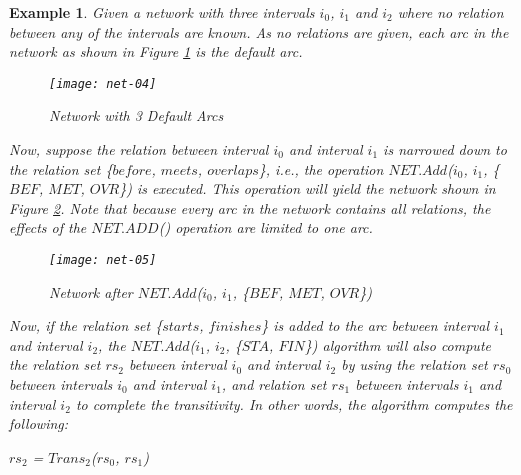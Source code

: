 \documentclass[11pt]{report}
\newtheorem{vexample}{Example}[chapter]
\newenvironment{vquote}
{
  \begin{list}{}{\leftmargin 1em}\item[]
}
{
  \end{list}
}
\begin{document}
          \begin{vexample}
            \label{exam-tempo-expl1}
            Given a network with three intervals $i_0$, $i_1$ and $i_2$ where
            no relation between any of the intervals are known. As no relations
            are given, each arc in the network as shown in Figure
            \ref{figu-tempo-ntwk4} is the default arc.

            \begin{figure}[tbhp]
              \begin{center}
                \texttt{[image: net-04]}
                \caption{Network with 3 Default Arcs}
                \label{figu-tempo-ntwk4}
              \end{center}
            \end{figure}

            Now, suppose the relation between interval $i_0$ and interval $i_1$
            is narrowed down to the relation set \{$before$, $meets$,
            $overlaps$\}, i.e., the operation $NET.Add$($i_0$, $i_1$, \{$BEF$,
            $MET$, $OVR$\}) is executed. This operation will yield the network
            shown in Figure \ref{figu-tempo-ntwk5}. Note that because every arc
            in the network contains all relations, the effects of the
            $NET.ADD$() operation are limited to one arc.

            \begin{figure}[tbhp]
              \begin{center}
                \texttt{[image: net-05]}
                \caption{Network after $NET.Add$($i_0$, $i_1$, \{$BEF$, $MET$, $OVR$\})}
                \label{figu-tempo-ntwk5}
              \end{center}
            \end{figure}

            Now, if the relation set \{$starts$, $finishes$\} is added to the
            arc between interval $i_1$ and interval $i_2$, the $NET.Add$($i_1$,
            $i_2$, \{$STA$, $FIN$\}) algorithm will also compute the relation
            set $rs_2$ between interval $i_0$ and interval $i_2$ by using the
            relation set $rs_0$ between intervals $i_0$ and interval $i_1$, and
            relation set $rs_1$ between intervals $i_1$ and interval $i_2$ to
            complete the transitivity. In other words, the algorithm computes
            the following:

            \begin{vquote}
              $rs_2$ = $Trans_2$($rs_0$, $rs_1$)


\end{vquote}
\end{vexample}
\end{document}
